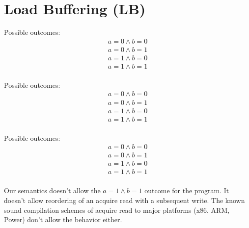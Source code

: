 
\section{Load Buffering (LB)}
\label{app:lb}

\begin{minipage}[t]{0.3\linewidth}
Possible outcomes:\\
\[\begin{array}{l}
a = 0 \land b = 0\\
a = 0 \land b = 1\\
a = 1 \land b = 0\\
a = 1 \land b = 1\\
\end{array}\]
\end{minipage}
%
\lbTemplate{\rlx}{\rlx}{\rlx}{\rlx}{\rlx}{\rlx}
\litmusTestEnd

\begin{minipage}[t]{0.3\linewidth}
Possible outcomes:\\
\[\begin{array}{l}
a = 0 \land b = 0\\
a = 0 \land b = 1\\
a = 1 \land b = 0\\
a = 1 \land b = 1\\
\end{array}\]
\end{minipage}
%
\lbTemplate{\rlx}{\rlx}{\rlx}{\rel}{\rlx}{\rel}
\litmusTestEnd

\begin{minipage}[t]{0.3\linewidth}
Possible outcomes:\\
\[\begin{array}{l}
a = 0 \land b = 0\\
a = 0 \land b = 1\\
a = 1 \land b = 0\\
a = 1 \land b = 1\\
\end{array}\]
\end{minipage}
%
\lbTemplate{\rlx}{\rlx}{\acq}{\rlx}{\acq}{\rlx}

Our semantics doesn't allow the $a = 1 \land b = 1$ outcome for the program.
It doesn't allow reordering of an acquire read with a subsequent write.
The known sound compilation schemes of acquire read to major platforms (x86, ARM, Power) don't
allow the behavior either. 

